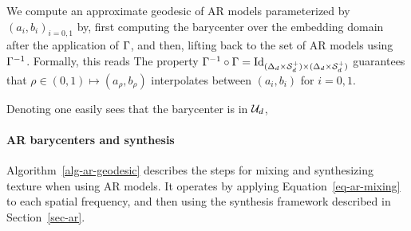 We compute an approximate geodesic of AR models parameterized by $(a_i,b_i)_{i=0,1}$ by, first computing the barycenter over the embedding domain after the application of $\Gamma$, and then, lifting back to the set of AR models using $\Gamma^{-1}$. Formally, this reads
The property $\Gamma^{-1} \circ \Gamma = \operatorname{Id}_{(\Delta_d \times \mathcal{S}_d^+) \times (\Delta_d \times \mathcal{S}_d^+)}$ guarantees that $\rho \in (0,1) \mapsto (a_\rho,b_\rho)$ interpolates between $(a_i,b_i)$ for $i=0,1$.

Denoting
one easily sees that the barycenter is in $\mathcal{U}_d$, 


%


\paragraph{AR barycenters and synthesis}

Algorithm~\ref{alg-ar-geodesic} describes the steps for mixing and synthesizing texture when using AR models. It operates by applying Equation~\eqref{eq-ar-mixing} to each spatial frequency, and then using the synthesis framework described in Section~\ref{sec-ar}.


